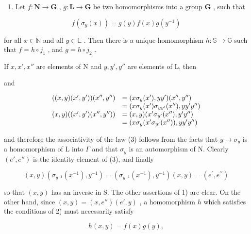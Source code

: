 \begin{enumerate}
\def\labelenumi{\arabic{enumi})}
\setcounter{enumi}{1}
\tightlist
\item
  Let \(f: \mathbf{N} \to \mathbf{G}\) , \(g: \mathbf{L} \to \mathbf{G}\) be two homomorphisms into a group \(\mathbf{G}\) , such that
\end{enumerate}

\[
f (\sigma_ {y} (x)) = g (y) f (x) g (y ^ {- 1})\tag{4}
\]

for all \(x \in \mathbb{N}\) and all \(y \in \mathbb{L}\) . Then there is a unique homomorphism \(h: \mathbb{S} \to \mathbb{G}\) such that \(f = h \circ j_1\) , and \(g = h \circ j_2\) .

If \(x, x', x''\) are elements of N and \(y, y', y''\) are elements of L, then

and

\[
\begin{array}{r l} ((x, y) (x ^ {\prime}, y ^ {\prime})) (x ^ {\prime \prime}, y ^ {\prime \prime}) & = (x \sigma_ {y} (x ^ {\prime}), y y ^ {\prime}) (x ^ {\prime \prime}, y ^ {\prime \prime}) \\ & = (x \sigma_ {y} (x ^ {\prime}) \sigma_ {y y ^ {\prime}} (x ^ {\prime \prime}), y y ^ {\prime} y ^ {\prime \prime}) \\ (x, y) ((x ^ {\prime}, y ^ {\prime}) (x ^ {\prime \prime}, y ^ {\prime \prime})) & = (x, y) (x ^ {\prime} \sigma_ {y ^ {\prime}} (x ^ {\prime \prime}), y ^ {\prime} y ^ {\prime \prime}) \\ & = (x \sigma_ {y} (x ^ {\prime} \sigma_ {y ^ {\prime}} (x ^ {\prime \prime})), y y ^ {\prime} y ^ {\prime \prime}) \end{array}
\]

and therefore the associativity of the law (3) follows from the facts that \(y \to \sigma_{y}\) is a homomorphism of L into \(\Gamma\) and that \(\sigma_{y}\) is an automorphism of N. Clearly \((e', e'')\) is the identity element of (3), and finally

\[
(x, y) \left(\sigma_ {y ^ {- 1}} (x ^ {- 1}), y ^ {- 1}\right) = \left(\sigma_ {y ^ {- 1}} (x ^ {- 1}), y ^ {- 1}\right) (x, y) = \left(e ^ {\prime}, e ^ {\prime \prime}\right)
\]

so that \((x, y)\) has an inverse in S. The other assertions of 1) are clear. On the other hand, since \((x, y) = (x, e'') (e', y)\) , a homomorphism \(h\) which satisfies the conditions of 2) must necessarily satisfy

\[
h (x, y) = f (x) g (y),
\]

